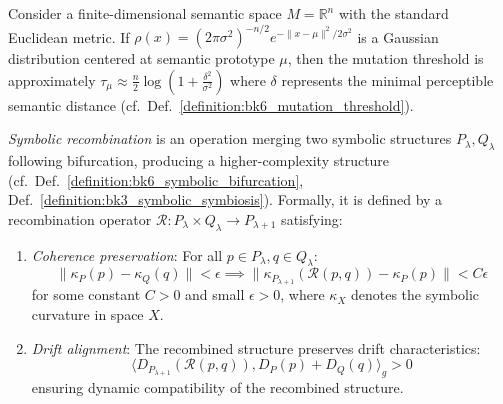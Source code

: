 \begin{scholium}
\label{scholium:bk6_mutation_threshold_in_semantic_space}
Consider a finite-dimensional semantic space $M = \mathbb{R}^n$ with the standard Euclidean metric. If $\rho(x) = (2\pi\sigma^2)^{-n/2}e^{-\|x-\mu\|^2/2\sigma^2}$ is a Gaussian distribution centered at semantic prototype $\mu$, then the mutation threshold is approximately $\tau_\mu \approx \frac{n}{2}\log(1+\frac{\delta^2}{\sigma^2})$ where $\delta$ represents the minimal perceptible semantic distance (cf.~Def.~\ref{definition:bk6_mutation_threshold}).
\end{scholium}
\begin{definition}
\label{definition:bk6_symbolic_recombination}
\emph{Symbolic recombination} is an operation merging two symbolic structures $P_\lambda, Q_\lambda$ following bifurcation, producing a higher-complexity structure (cf.~Def.~\ref{definition:bk6_symbolic_bifurcation}, Def.~\ref{definition:bk3_symbolic_symbiosis}). Formally, it is defined by a recombination operator $\mathcal{R}: P_\lambda \times Q_\lambda \rightarrow P_{\lambda+1}$ satisfying:
\begin{enumerate}
\item \emph{Coherence preservation}: For all $p \in P_\lambda, q \in Q_\lambda$:
\begin{equation}
\| \kappa_P(p) - \kappa_Q(q) \| < \epsilon \implies \| \kappa_{P_{\lambda+1}}(\mathcal{R}(p,q)) - \kappa_P(p) \| < C\epsilon
\end{equation}
for some constant $C > 0$ and small $\epsilon > 0$, where $\kappa_X$ denotes the symbolic curvature in space $X$.
\item \emph{Drift alignment}: The recombined structure preserves drift characteristics:
\begin{equation}
\langle D_{P_{\lambda+1}}(\mathcal{R}(p,q)), D_P(p) + D_Q(q) \rangle_g > 0
\end{equation}
ensuring dynamic compatibility of the recombined structure.
\end{enumerate}
\end{definition}
